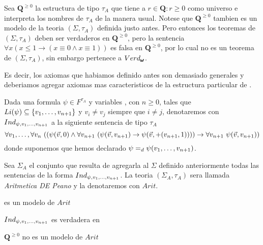   \begin{remark}
    
  Sea $\mathbf{Q}^{\geq 0}$ la estructura de tipo $\tau_A$ que tiene a ${r\in\mathbf{Q}:r\geq0}$ como universo e interpreta
  los nombres de $\tau_A$ de la manera usual. Notese que $\mathbf{Q}^{\geq 0}$ tambien es un modelo de la teoria $(\Sigma, \tau_A)$ definida justo antes.
  Pero entonces los teoremas de $(\Sigma,\tau_A)$ deben ser verdaderos en $\mathbf{Q}^{\geq 0}$, pero la sentencia 
  $\forall x (x\leq1\rightarrow (x\equiv0\land x\equiv1))$ es falsa en $\mathbf{Q}^{\geq 0}$, por lo cual no es 
  un teorema de $(\Sigma,\tau_A)$, sin embargo pertenece a $Verd_{\pmb{\omega}}$.
  
  Es decir, los axiomas que habiamos definido antes son demasiado generales y deberiamos agregar axiomas mas caracteristicos de la estructura
  particular de \pomega.
  \end{remark}

  \begin{definition}
    Dada una formula $\psi\in F^{\tau_A}$ y variables , con $n\geq0$, tales que $Li(\psi)\subseteq\{v_{1}, \dots, v_{n+1}\}$ y $v_i\neq v_j$ siempre que $i\neq j$,
    denotaremos con $Ind_{\psi,v_{1}, \dots, v_{n+1}}$ a la siguiente sentencia de tipo $\tau_A$
    $$
    \succession{\forall v}{1}{n}\ ((\psi(\vec{v},0)\land\forall v_{n+1}\ (\psi(\vec{v},v_{n+1})\rightarrow\psi(\vec{v},+(v_{n+1},1))))\rightarrow\forall v_{n+1}\ \psi(\vec{v},v_{n+1}))
    $$
    donde suponemos que hemos declarado $\psi=_d\psi(v_{1}, \dots, v_{n+1})$.

    Sea $\Sigma_A$ el conjunto que resulta de agregarla al $\Sigma$ definido anteriormente todas las sentencias de la forma $Ind_{\psi,v_{1}, \dots, v_{n+1}}$.
    La teoria $(\Sigma_A,\tau_A)$ sera llamada \emph{Aritmetica DE Peano} y la denotaremos con $Arit$.
  \end{definition}

  \begin{lemma}
    \pomega es un modelo de $Arit$
  \end{lemma}

  \begin{remark}
    $Ind_{\psi,v_{1}, \dots, v_{n+1}}$ es verdadera en \pomega
  \end{remark}

  \begin{remark}
    $\mathbf{Q}^{\geq 0}$ no es un modelo de $Arit$
  \end{remark}

